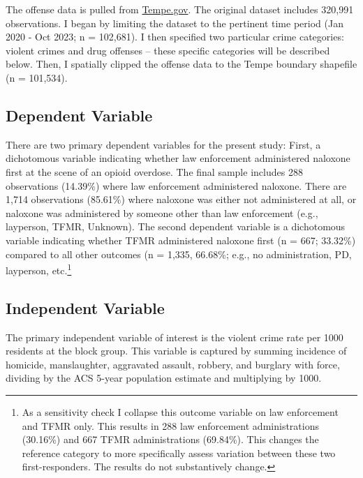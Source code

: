 The offense data is pulled from \href{https://data.tempe.gov/datasets/1563be5b343b4f78b1163e97a9a503ad_0/explore?location=32.279019%2C-112.767075%2C7.97}{Tempe.gov}. The original dataset includes 320,991 observations. I began by limiting the dataset to the pertinent time period (Jan 2020 - Oct 2023; n = 102,681). I then specified two particular crime categories: violent crimes and drug offenses -- these specific categories will be described below. Then, I spatially clipped the offense data to the Tempe boundary shapefile (n = 101,534). 

\subsection{Dependent Variable}
There are two primary dependent variables for the present study: First, a dichotomous variable indicating whether law enforcement administered naloxone first at the scene of an opioid overdose. The final sample includes 288 observations (14.39\%) where law enforcement administered naloxone. There are 1,714 observations (85.61\%) where naloxone was either not administered at all, or naloxone was administered by someone other than law enforcement (e.g., layperson, TFMR, Unknown). The second dependent variable is a dichotomous variable indicating whether TFMR administered naloxone first (n = 667; 33.32\%) compared to all other outcomes (n = 1,335, 66.68\%; e.g., no administration, PD, layperson, etc.\footnote{As a sensitivity check I collapse this outcome variable on law enforcement and TFMR only. This results in 288 law enforcement administrations (30.16\%) and 667 TFMR administrations (69.84\%). This changes the reference category to more specifically assess variation between these two first-responders. The results do not substantively change.}

\subsection{Independent Variable}
The primary independent variable of interest is the violent crime rate per 1000 residents at the block group. This variable is captured by summing incidence of homicide, manslaughter, aggravated assault, robbery, and burglary with force, dividing by the ACS 5-year population estimate and multiplying by 1000.

